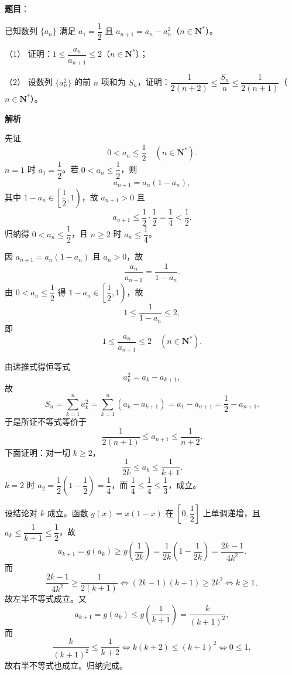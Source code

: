 \begin{answer}

\textbf{题目}：

已知数列 \(\{a_n\}\) 满足 \(a_1=\dfrac12\) 且 \(a_{n+1}=a_n-a_n^2\)（\(n\in\mathbf{N}^*\)）。

（1） 证明：\(1\leqslant\dfrac{a_n}{a_{n+1}}\leqslant2\)（\(n\in\mathbf{N}^*\)）；

（2） 设数列 \(\{a_n^2\}\) 的前 \(n\) 项和为 \(S_n\)，证明：\(\dfrac{1}{2(n+2)}\leqslant\dfrac{S_n}{n}\leqslant\dfrac{1}{2(n+1)}\)（\(n\in\mathbf{N}^*\)）。

\textbf{解析}

先证
\nopagebreak[4]
\[
0<a_n\leqslant\frac12\quad(n\in\mathbf{N}^*).
\]
\(n=1\) 时 \(a_1=\dfrac12\)。若 \(0<a_n\leqslant\dfrac12\)，则
\nopagebreak[4]
\[
a_{n+1}=a_n(1-a_n),
\]
其中 \(1-a_n\in\left[\dfrac12,1\right)\)，故 \(a_{n+1}>0\) 且
\nopagebreak[4]
\[
a_{n+1}\leqslant\frac12\cdot\frac12=\frac14<\frac12.
\]
归纳得 \(0<a_n\leqslant\dfrac12\)，且 \(n\geqslant2\) 时 \(a_n\leqslant\dfrac14\)。


因 \(a_{n+1}=a_n(1-a_n)\) 且 \(a_n>0\)，故
\nopagebreak[4]
\[
\frac{a_n}{a_{n+1}}=\frac{1}{1-a_n}.
\]
由 \(0<a_n\leqslant\dfrac12\) 得 \(1-a_n\in\left[\dfrac12,1\right)\)，故
\nopagebreak[4]
\[
1\leqslant\frac{1}{1-a_n}\leqslant2,
\]
即
\nopagebreak[4]
\[
1\leqslant\frac{a_n}{a_{n+1}}\leqslant2\quad(n\in\mathbf{N}^*).
\]


由递推式得恒等式
\nopagebreak[4]
\[
a_k^2=a_k-a_{k+1},
\]
故
\nopagebreak[4]
\[
S_n=\sum_{k=1}^n a_k^2=\sum_{k=1}^n\left(a_k-a_{k+1}\right)
=a_1-a_{n+1}=\frac12-a_{n+1}.
\]
于是所证不等式等价于
\nopagebreak[4]
\[
\frac{1}{2(n+1)}\leqslant a_{n+1}\leqslant\frac{1}{n+2}.
\]
下面证明：对一切 \(k\geqslant2\)，
\nopagebreak[4]
\[
\frac{1}{2k}\leqslant a_k\leqslant\frac{1}{k+1}.
\]
\(k=2\) 时 \(a_2=\dfrac12\left(1-\dfrac12\right)=\dfrac14\)，而 \(\dfrac14\leqslant\dfrac14\leqslant\dfrac13\)，成立。

设结论对 \(k\) 成立。函数 \(g(x)=x(1-x)\) 在 \(\left[0,\dfrac12\right]\) 上单调递增，且 \(a_k\leqslant\dfrac{1}{k+1}\leqslant\dfrac12\)，故
\nopagebreak[4]
\[
a_{k+1}=g(a_k)\geqslant g\left(\frac{1}{2k}\right)
=\frac{1}{2k}\left(1-\frac{1}{2k}\right)
=\frac{2k-1}{4k^2}.
\]
而
\nopagebreak[4]
\[
\frac{2k-1}{4k^2}\geqslant\frac{1}{2(k+1)}
\iff(2k-1)(k+1)\geqslant2k^2
\iff k\geqslant1,
\]
故左半不等式成立。又
\nopagebreak[4]
\[
a_{k+1}=g(a_k)\leqslant g\left(\frac{1}{k+1}\right)
=\frac{k}{(k+1)^2},
\]
而
\nopagebreak[4]
\[
\frac{k}{(k+1)^2}\leqslant\frac{1}{k+2}
\iff k(k+2)\leqslant(k+1)^2
\iff0\leqslant1,
\]
故右半不等式也成立。归纳完成。


\end{answer}
